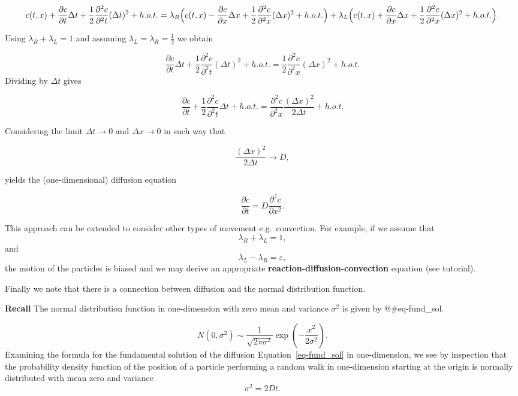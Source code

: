 \documentclass[
  letterpaper,
  DIV=11,
  numbers=noendperiod]{scrreprt}
\theoremstyle{definition}
\theoremstyle{plain}
\theoremstyle{plain}
\theoremstyle{remark}
\begin{document}
\[
c(t,x) + \frac{ \partial c}{\partial t} \Delta t + \frac 12  \frac{ \partial^2 c}{\partial^2 t} (\Delta t )^2  + h.o.t. =
\lambda_R \Big( c(t,x) - \frac{ \partial c}{\partial x} \Delta x + \frac 12  \frac{ \partial^2 c}{\partial^2 x} (\Delta x )^2  + h.o.t. \Big)\\ +
\lambda_L \Big( c(t,x) + \frac{ \partial c}{\partial x} \Delta x + \frac 12  \frac{ \partial^2 c}{\partial^2 x} (\Delta x )^2  + h.o.t. \Big).
\]

Using \(\lambda_R+ \lambda_L =1\) and assuming
\(\lambda_L = \lambda_R = \frac 12\) we obtain

\[
 \frac{ \partial c}{\partial t} \Delta t + \frac 12  \frac{ \partial^2 c}{\partial^2 t} (\Delta t )^2  + h.o.t. =
 \frac 12  \frac{ \partial^2 c}{\partial^2 x} (\Delta x )^2  + h.o.t. 
\] Dividing by \(\Delta t\) gives

\[
 \frac{ \partial c}{\partial t}  + \frac 12  \frac{ \partial^2 c}{\partial^2 t} \Delta t   + h.o.t. =
   \frac{ \partial^2 c}{\partial^2 x} \frac{(\Delta x )^2 }{2\Delta t} + h.o.t. 
\]

Considering the limit \(\Delta t \to 0\) and \(\Delta x \to 0\) in such
way that

\[
 \frac{(\Delta x )^2 }{2\Delta t} \to D,
\]

yields the (one-dimensional) diffusion equation

\[
\frac{\partial c}{\partial t} = D \frac{\partial^2 c}{\partial x^2}.
\]

This approach can be extended to consider other types of movement
e.g.~convection. For example, if we assume that\\
\[
\lambda_R+ \lambda_L =1,
\] and \[
\lambda_L - \lambda_R = \varepsilon,
\] the motion of the particles is biased and we may derive an
appropriate \textbf{reaction-diffusion-convection} equation (see
tutorial).

Finally we note that there is a connection between diffusion and the
normal distribution function.

\textbf{Recall} The normal distribution function in one-dimension with
zero mean and variance \(\sigma^2\) is given by @\#eq-fund\_sol.

\[
N(0, \sigma^2) \sim \frac 1 { \sqrt{ 2 \pi \sigma^2}} \exp \left( - \frac{x^2}{ 2 \sigma^2}\right).
\] Examining the formula for the fundamental solution of the diffusion
Equation~\ref{eq-fund_sol} in one-dimension, we see by inspection that
the probability density function of the position of a particle
performing a random walk in one-dimension starting at the origin is
normally distributed with mean zero and variance \[
\sigma^2 = 2 D t.
\]
\end{document}
